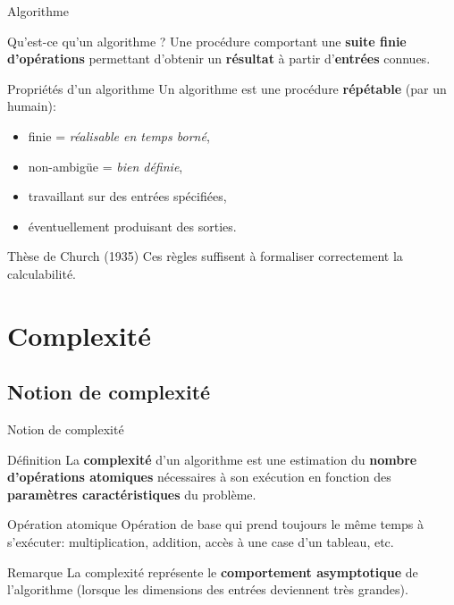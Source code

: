 \begin{frame}{Algorithme}

\begin{block}{Qu'est-ce qu'un algorithme ?}
Une procédure comportant une \textbf{suite finie d'opérations} permettant d'obtenir un \textbf{résultat} à partir d'\textbf{entrées} connues.
\end{block}
\pause
\begin{exampleblock}{Propriétés d'un algorithme}
Un algorithme est une procédure \textbf{répétable} (par un humain):
    \begin{itemize}
         \item<+-> finie = \emph{réalisable en temps borné},
        \item<+-> non-ambigüe = \emph{bien définie},
        \item<+-> travaillant sur des entrées spécifiées,
        \item<+-> éventuellement produisant des sorties.
    \end{itemize}
\end{exampleblock}
\pause
        \begin{alertblock}{Thèse de Church (1935)}
        Ces règles suffisent à formaliser correctement la calculabilité.
\end{alertblock}
\end{frame}

\section{Complexité}

\subsection{Notion de complexité}

\begin{frame}{Notion de complexité}
    \begin{block}{Définition}
    La \textbf{complexité} d'un algorithme est une estimation du \textbf{nombre d'opérations atomiques} nécessaires à son exécution en fonction des \textbf{paramètres caractéristiques} du problème.
    \end{block}

    \begin{alertblock}{Opération atomique}
    Opération de base qui prend toujours le même temps à s'exécuter: multiplication, addition, accès à une case d'un tableau, etc.
    \end{alertblock}

    \begin{exampleblock}{Remarque}
    La complexité représente le \textbf{comportement asymptotique} de l'algorithme (lorsque les dimensions des entrées deviennent très grandes).
    \end{exampleblock}
\end{frame}

